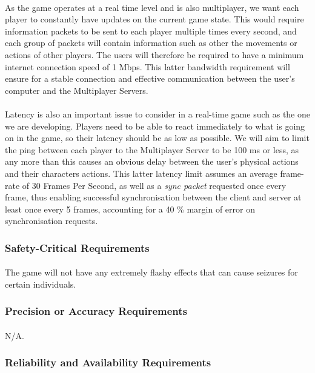\documentclass[12pt, titlepage]{article}
\begin{document}
\paragraph{}As the game operates at a real time level and is also multiplayer, we want each player to constantly have updates on the current game state. This would require information packets to be sent to each player multiple times every second, and each group of packets will contain information such as other the movements or actions of other players. The users will therefore be required to have a minimum internet connection speed of 1 Mbps. This latter bandwidth requirement will ensure for a stable connection and effective communication between the user's computer and the Multiplayer Servers.
\paragraph{}Latency is also an important issue to consider in a real-time game such as the one we are developing. Players need to be able to react immediately to what is going on in the game, so their latency should be as low as possible. We will aim to limit the ping between each player to the Multiplayer Server to be 100 ms or less, as any more than this causes an obvious delay between the user's physical actions and their characters actions. This latter latency limit assumes an average frame-rate of 30 Frames Per Second, as well as a \emph{sync packet} requested once every frame, thus enabling  successful synchronisation between the client and server at least once every 5 frames, accounting for a 40 \% margin of error on synchronisation requests.
\subsubsection{Safety-Critical Requirements}
\paragraph{}The game will not have any extremely flashy effects that can cause seizures for certain individuals. 
\subsubsection{Precision or Accuracy Requirements}
\paragraph{}N/A.
\subsubsection{Reliability and Availability Requirements}
\end{document}
